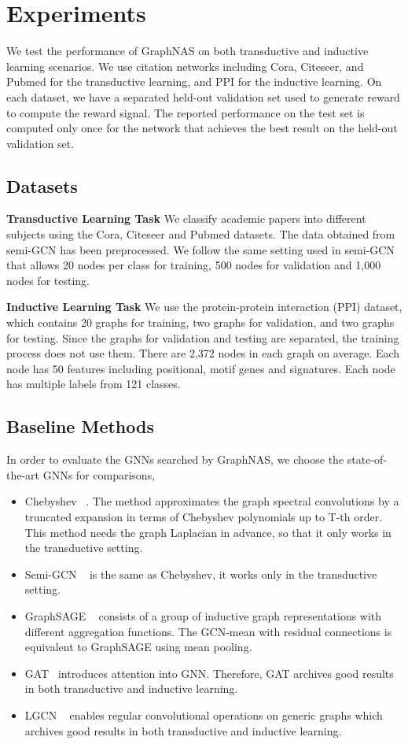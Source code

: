 \documentclass{article}
\begin{document}
\section{Experiments}
We test the performance of GraphNAS on both transductive and inductive learning scenarios. We use citation networks including Cora, Citeseer, and Pubmed for the transductive learning, and PPI for the inductive learning. On each dataset, we have a separated held-out validation set used to generate reward to compute the reward signal. The reported performance on the test set is computed only once for the network that achieves the best result on the held-out validation set. 



\subsection{Datasets}
\textbf{Transductive Learning Task}
We classify academic papers into different subjects using the Cora, Citeseer and Pubmed datasets. The data obtained from semi-GCN \cite{kipf2017semi} has been preprocessed. We follow the same setting used in semi-GCN that allows 20 nodes per class for training, 500 nodes for validation and 1,000 nodes for testing. 

\textbf{Inductive Learning Task}
We use the protein-protein interaction (PPI) dataset, which contains 20 graphs for training, two graphs for validation, and two graphs for testing. Since the graphs for validation and testing are separated, the training process does not use them. There are 2,372 nodes in each graph on average. Each node has 50 features including positional, motif genes and signatures. Each node has multiple labels from 121 classes.

\subsection{Baseline Methods}
In order to evaluate the GNNs searched by GraphNAS, we choose the state-of-the-art GNNs for comparisons, 
\begin{itemize}
	\item Chebyshev ~\cite{Defferrard2016ConvolutionalNN}. The method approximates the graph spectral convolutions by a truncated expansion in terms of Chebyshev polynomials up to T-th order. This method needs the graph Laplacian in advance, so that it only works in the transductive setting.
	\item Semi-GCN ~\cite{kipf2017semi} is the same as Chebyshev, it works only in the transductive setting. 
	\item GraphSAGE ~\cite{GraphSAGE}  consists of a group of inductive graph representations with different aggregation functions. The GCN-mean with residual connections is equivalent to GraphSAGE using mean pooling.
	\item GAT~\cite{GAT} introduces attention into GNN. Therefore, GAT  archives good results in both transductive and inductive learning.
	\item LGCN ~\cite{Gao2018LargeScaleLG}  enables regular convolutional operations on generic graphs which archives good results in both transductive and inductive learning.
\end{itemize}
\end{document}
